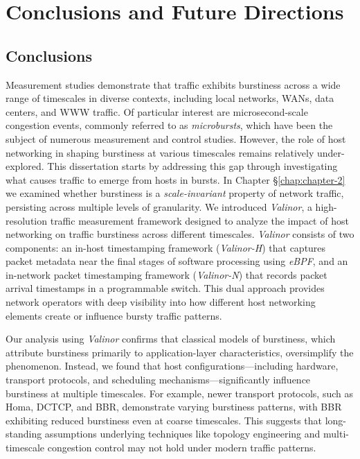 \chapter{Conclusions and Future Directions} \label{chap:chap-6}


\section{Conclusions}
Measurement studies demonstrate that traffic exhibits burstiness across a wide range of timescales in diverse contexts, including local networks, WANs, data centers, and WWW traffic. Of particular interest are microsecond-scale congestion events, commonly referred to as \emph{microbursts}, which have been the subject of numerous measurement and control studies. However, the role of host networking in shaping burstiness at various timescales remains relatively under-explored. This dissertation starts by addressing this gap through investigating what causes traffic to emerge from hosts in bursts.
In Chapter \S\ref{chap:chapter-2} we examined whether burstiness is a \emph{scale-invariant} property of network traffic, persisting across multiple levels of granularity.
We introduced \textit{Valinor}, a high-resolution traffic measurement framework designed to analyze the impact of host networking on traffic burstiness across different timescales. \textit{Valinor} consists of two components: an in-host timestamping framework (\textit{Valinor-H}) that captures packet metadata near the final stages of software processing using \textit{eBPF}, and an in-network packet timestamping framework (\textit{Valinor-N}) that records packet arrival timestamps in a programmable switch. This dual approach provides network operators with deep visibility into how different host networking elements create or influence bursty traffic patterns.

Our analysis using \textit{Valinor} confirms that classical models of burstiness, which attribute burstiness primarily to application-layer characteristics, oversimplify the phenomenon. Instead, we found that host configurations—including hardware, transport protocols, and scheduling mechanisms—significantly influence burstiness at multiple timescales. For example, newer transport protocols, such as Homa, DCTCP, and BBR, demonstrate varying burstiness patterns, with BBR exhibiting reduced burstiness even at coarse timescales. This suggests that long-standing assumptions underlying techniques like topology engineering and multi-timescale congestion control may not hold under modern traffic patterns.


